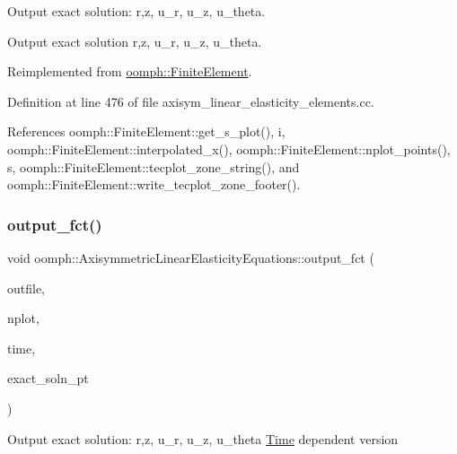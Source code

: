 Output exact solution\+: r,z, u\+\_\+r, u\+\_\+z, u\+\_\+theta. 

Output exact solution r,z, u\+\_\+r, u\+\_\+z, u\+\_\+theta. 

Reimplemented from \hyperlink{classoomph_1_1FiniteElement_a22b695c714f60ee6cd145be348042035}{oomph\+::\+Finite\+Element}.



Definition at line 476 of file axisym\+\_\+linear\+\_\+elasticity\+\_\+elements.\+cc.



References oomph\+::\+Finite\+Element\+::get\+\_\+s\+\_\+plot(), i, oomph\+::\+Finite\+Element\+::interpolated\+\_\+x(), oomph\+::\+Finite\+Element\+::nplot\+\_\+points(), s, oomph\+::\+Finite\+Element\+::tecplot\+\_\+zone\+\_\+string(), and oomph\+::\+Finite\+Element\+::write\+\_\+tecplot\+\_\+zone\+\_\+footer().

\mbox{\label{classoomph_1_1AxisymmetricLinearElasticityEquations_aab25e54e0e6b64c7f758d815884329e4}} 
\subsubsection{\texorpdfstring{output\+\_\+fct()}{output\_fct()}\hspace{0.1cm}{\footnotesize\ttfamily [2/2]}}
{\footnotesize\ttfamily void oomph\+::\+Axisymmetric\+Linear\+Elasticity\+Equations\+::output\+\_\+fct (\begin{DoxyParamCaption}\item[{std\+::ostream \&}]{outfile,  }\item[{const unsigned \&}]{nplot,  }\item[{const double \&}]{time,  }\item[{\hyperlink{classoomph_1_1FiniteElement_ad4ecf2b61b158a4b4d351a60d23c633e}{Finite\+Element\+::\+Unsteady\+Exact\+Solution\+Fct\+Pt}}]{exact\+\_\+soln\+\_\+pt }\end{DoxyParamCaption})\hspace{0.3cm}{\ttfamily [virtual]}}

Output exact solution\+: r,z, u\+\_\+r, u\+\_\+z, u\+\_\+theta \hyperlink{classoomph_1_1Time}{Time} dependent version

